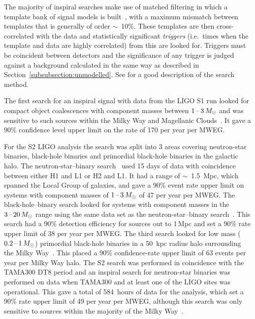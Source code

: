 The majority of inspiral searches make use of matched filtering in which a
template bank of signal models is built~\cite{Owen:1996, Owen:1999}, with a
maximum mismatch between templates that is generally of order $\sim$~10\%. These
templates are then cross-correlated with the data and statistically significant
\textit{triggers} (i.e.\ times when the template and data are highly correlated)
from this are looked for. Triggers must be coincident between detectors and the
significance of any trigger is judged against a background calculated in the
same way as described in Section~\ref{subsubsection:unmodelled}. See
\cite{Abbott:2005b} for a good description of the search method.


The first search for an inspiral signal with data from the LIGO S1 run looked
for compact object coalescences with component masses between $1\mbox{\,--\,}3\,M_{\odot}$
and was sensitive to such sources within the Milky Way and Magellanic
Clouds~\cite{Abbott:2004c}. It gave a 90\% confidence level upper
limit on the rate of 170 per year per MWEG.


For the S2 LIGO analysis the search was split into 3 areas covering neutron-star
binaries, black-hole binaries and primordial black-hole binaries in the galactic
halo. The neutron-star--binary search~\cite{Abbott:2005b} used 15 days of data
with coincidence between either H1 and L1 or H2 and L1. It had a range of
$\sim$~1.5~Mpc, which spanned the Local Group of galaxies, and gave a 90\% event
rate upper limit on systems with component masses of $1\mbox{\,--\,}3\,M_{\odot}$ of 47 per
year per MWEG. The black-hole--binary search looked for systems with component
masses in the $3\mbox{\,--\,}20\,M_{\odot}$ range using the same data set as the
neutron-star--binary search~\cite{Abbott:2006a}. This search had a 90\% detection
efficiency for sources out to 1\,Mpc and set a 90\% rate upper limit of 38 per
year per MWEG. The third search looked for low mass ($0.2\mbox{\,--\,}1\,M_{\odot}$)
primordial black-hole binaries in a 50~kpc radius halo surrounding the Milky
Way~\cite{Abbott:2005e}. This placed a 90\% confidence-rate upper limit of 63
events per year per Milky Way halo. The S2 search was performed in coincidence
with the TAMA300 DT8 period and an inspiral search for neutron-star binaries
was
performed on data when TAMA300 and at least one of the LIGO sites was
operational. This gave a total of 584~hours of data for the analysis, which set
a 90\% rate upper limit of 49 per year per MWEG, although this search was only
sensitive to sources within the majority of the Milky Way~\cite{Abbott:2006b}.


